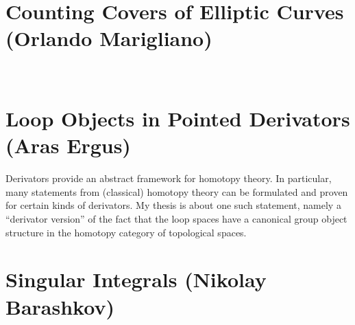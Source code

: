 \tableofcontents

\clearpage

\section{Counting Covers of Elliptic Curves (Orlando Marigliano)}

\ 

\section{Loop Objects in Pointed Derivators (Aras Ergus)}

Derivators provide an abstract framework for homotopy
theory. In particular, many statements from (classical) homotopy theory
can be formulated and proven for certain kinds of derivators. My thesis
is about one such statement, namely a ``derivator version'' of the fact that
the loop spaces have a canonical group object structure in the homotopy
category of topological spaces.

\section{Singular Integrals (Nikolay Barashkov)}

\ 
